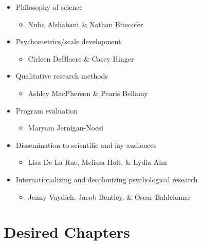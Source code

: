 \documentclass[
  11pt,
]{book}
\providecommand{\tightlist}{%
  \setlength{\itemsep}{0pt}\setlength{\parskip}{0pt}}
\begin{document}
\begin{itemize}
\tightlist
\item
  Philosophy of science

  \begin{itemize}
  \tightlist
  \item
    Nuha Alshabani \& Nathan Bitecofer
  \end{itemize}
\item
  Psychometrics/scale development

  \begin{itemize}
  \tightlist
  \item
    Cirleen DeBlaere \& Casey Hinger
  \end{itemize}
\item
  Qualitative research methods

  \begin{itemize}
  \tightlist
  \item
    Ashley MacPherson \& Pearis Bellamy
  \end{itemize}
\item
  Program evaluation

  \begin{itemize}
  \tightlist
  \item
    Maryam Jernigan-Noesi
  \end{itemize}
\item
  Dissemination to scientific and lay audiences

  \begin{itemize}
  \tightlist
  \item
    Lisa De La Rue, Melissa Holt, \& Lydia Ahn
  \end{itemize}
\item
  Internationalizing and decolonizing psychological research

  \begin{itemize}
  \tightlist
  \item
    Jenny Vaydich, Jacob Bentley, \& Oscar Baldelomar
  \end{itemize}
\end{itemize}

\hypertarget{desired-chapters}{%
\section{Desired Chapters}\label{desired-chapters}}
\end{document}

